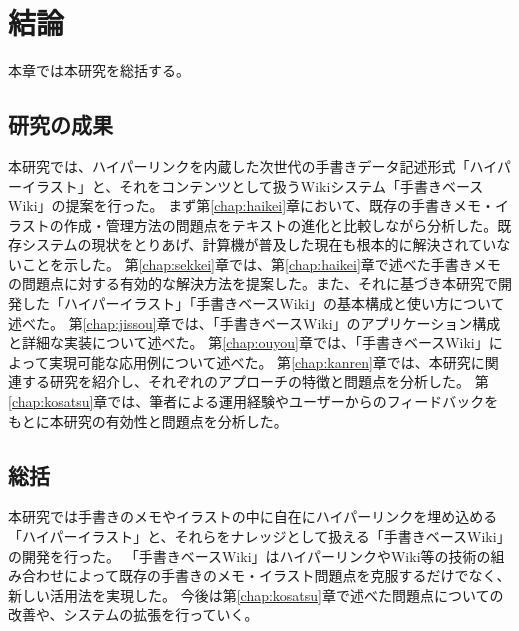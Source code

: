 \chapter{結論}
\label{chap:kekka}

本章では本研究を総括する。

\newpage

\section{研究の成果}
本研究では、ハイパーリンクを内蔵した次世代の手書きデータ記述形式「ハイパーイラスト」と、それをコンテンツとして扱うWikiシステム「手書きベースWiki」の提案を行った。
まず第\ref{chap:haikei}章において、既存の手書きメモ・イラストの作成・管理方法の問題点をテキストの進化と比較しながら分析した。既存システムの現状をとりあげ、計算機が普及した現在も根本的に解決されていないことを示した。
第\ref{chap:sekkei}章では、第\ref{chap:haikei}章で述べた手書きメモの問題点に対する有効的な解決方法を提案した。また、それに基づき本研究で開発した「ハイパーイラスト」「手書きベースWiki」の基本構成と使い方について述べた。
第\ref{chap:jissou}章では、「手書きベースWiki」のアプリケーション構成と詳細な実装について述べた。
第\ref{chap:ouyou}章では、「手書きベースWiki」によって実現可能な応用例について述べた。
第\ref{chap:kanren}章では、本研究に関連する研究を紹介し、それぞれのアプローチの特徴と問題点を分析した。
第\ref{chap:kosatsu}章では、筆者による運用経験やユーザーからのフィードバックをもとに本研究の有効性と問題点を分析した。

\section{総括}
本研究では手書きのメモやイラストの中に自在にハイパーリンクを埋め込める「ハイパーイラスト」と、それらをナレッジとして扱える「手書きベースWiki」の開発を行った。
「手書きベースWiki」はハイパーリンクやWiki等の技術の組み合わせによって既存の手書きのメモ・イラスト問題点を克服するだけでなく、新しい活用法を実現した。
今後は第\ref{chap:kosatsu}章で述べた問題点についての改善や、システムの拡張を行っていく。